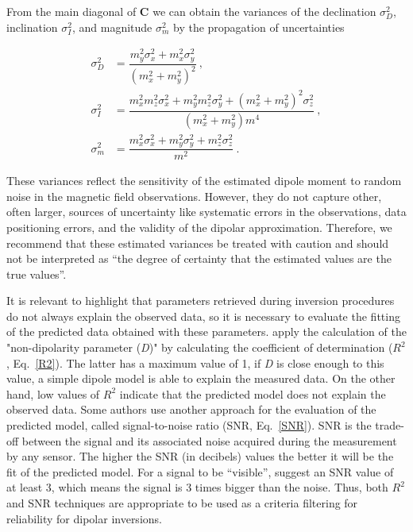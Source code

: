 From the main diagonal of $\mathbf{C}$ we can obtain the variances of the
declination $\sigma_D^2$, inclination $\sigma_I^2$, and magnitude $\sigma_m^2$
by the propagation of uncertainties

\begin{equation}
\begin{aligned}
\sigma_D^2 &= \dfrac{m_y^2\sigma_x^2 + m_x^2\sigma_y^2}{\left(m_x^2 + m_y^2\right)^2} \ , \\
\sigma_I^2 &= \dfrac{m_x^2 m_z^2 \sigma_x^2 + m_y^2 m_z^2 \sigma_y^2 + \left(m_x^2 + m_y^2\right)^2\sigma_z^2}{\left(m_x^2 + m_y^2\right) m^4} \ , \\
\sigma_m^2 &= \dfrac{m_x^2\sigma_x^2 + m_y^2\sigma_y^2 + m_z^2\sigma_z^2}{m^2} \ .
\end{aligned}
\end{equation}

\noindent
These variances reflect the sensitivity of the estimated dipole moment to random noise in the magnetic field observations. However, they do not capture other, often larger, sources of uncertainty like systematic errors in the observations, data positioning errors, and the validity of the dipolar approximation. Therefore, we recommend that these estimated variances be treated with caution and should not be interpreted as ``the degree of certainty that the estimated values are the true values''.

It is relevant to highlight that parameters retrieved during inversion procedures do not always explain the observed data, so it is necessary to evaluate the fitting of the predicted data obtained with these parameters. \cite{Fu2020} apply the calculation of the "non-dipolarity parameter (\emph{D})" by calculating the coefficient of determination ($R^2$, Eq.~\ref{R2}). The latter has a maximum value of 1, if \emph{D} is close enough to this value, a simple dipole model is able to explain the measured data. On the other hand, low values of $R^2$ indicate that the predicted model does not explain the observed data. Some authors \citep[e.g.,][]{Myre2019, CortesOrtuno2021, Lima2009} use another approach for the evaluation of the predicted model, called signal-to-noise ratio (SNR, Eq.~\ref{SNR}). SNR is the trade-off between the signal and its associated noise acquired during the measurement by any sensor. The higher the SNR (in decibels) values the better it will be the fit of the predicted model. For a signal to be “visible”,  \cite{Strum2014} suggest an SNR value of at least 3, which means the signal is 3 times bigger than the noise. Thus, both $R^2$ and SNR techniques are appropriate to be used as a criteria filtering for reliability for dipolar inversions.

